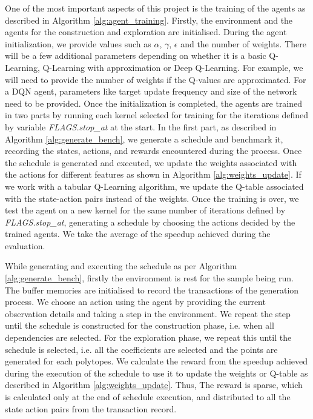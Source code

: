 \documentclass[logo,msc]{infthesis}           %
\begin{document}
One of the most important aspects of this project is the training of the agents as described in Algorithm \ref{alg:agent_training}. Firstly, the environment and the agents for the construction and exploration are initialised. During the agent initialization, we provide values such as $\alpha$, $\gamma$, $\epsilon$ and the number of weights. There will be a few additional parameters depending on whether it is a basic Q-Learning, Q-Learning with approximation or Deep Q-Learning. For example, we will need to provide the number of weights if the Q-values are approximated. For a DQN agent, parameters like target update frequency and size of the network need to be provided. Once the initialization is completed, the agents are trained in two parts by running each kernel selected for training for the iterations defined by variable \textit{FLAGS.stop\_at} at the start. In the first part, as described in Algorithm \ref{alg:generate_bench}, we generate a schedule and benchmark it, recording the states, actions, and rewards encountered during the process. Once the schedule is generated and executed, we update the weights associated with the actions for different features as shown in Algorithm \ref{alg:weights_update}. If we work with a tabular Q-Learning algorithm, we update the Q-table associated with the state-action pairs instead of the weights. Once the training is over, we test the agent on a new kernel for the same number of iterations defined by \textit{FLAGS.stop\_at}, generating a schedule by choosing the actions decided by the trained agents. We take the average of the speedup achieved during the evaluation.

While generating and executing the schedule as per Algorithm \ref{alg:generate_bench}, firstly the environment is rest for the sample being run. The buffer memories are initialised to record the transactions of the generation process. We choose an action using the agent by providing the current observation details and taking a step in the environment. We repeat the step until the schedule is constructed for the construction phase, i.e. when all dependencies are selected. For the exploration phase, we repeat this until the schedule is selected, i.e. all the coefficients are selected and the points are generated for each polytopes.  We calculate the reward from the speedup achieved during the execution of the schedule to use it to update the weights or Q-table as described in Algorithm \ref{alg:weights_update}. Thus, The reward is sparse, which is calculated only at the end of schedule execution, and distributed to all the state action pairs from the transaction record. 
\end{document}
